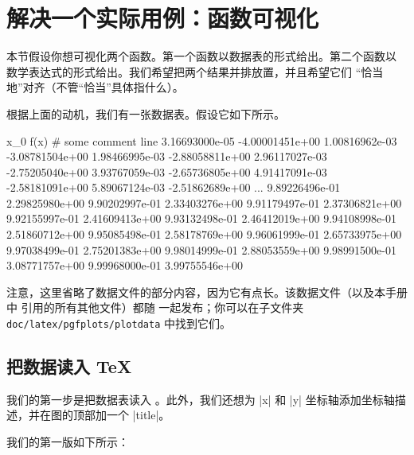 \section{解决一个实际用例：函数可视化}

本节假设你想可视化两个函数。第一个函数以数据表的形式给出。第二个函数以
数学表达式的形式给出。我们希望把两个结果并排放置，并且希望它们
“恰当地”对齐（不管“恰当”具体指什么）。

根据上面的动机，我们有一张数据表。假设它如下所示。
%
\begin{codeexample}
x_0	f(x)
# some comment line
3.16693000e-05	-4.00001451e+00
1.00816962e-03	-3.08781504e+00
1.98466995e-03	-2.88058811e+00
2.96117027e-03	-2.75205040e+00
3.93767059e-03	-2.65736805e+00
4.91417091e-03	-2.58181091e+00
5.89067124e-03	-2.51862689e+00
...
9.89226496e-01	2.29825980e+00
9.90202997e-01	2.33403276e+00
9.91179497e-01	2.37306821e+00
9.92155997e-01	2.41609413e+00
9.93132498e-01	2.46412019e+00
9.94108998e-01	2.51860712e+00
9.95085498e-01	2.58178769e+00
9.96061999e-01	2.65733975e+00
9.97038499e-01	2.75201383e+00
9.98014999e-01	2.88053559e+00
9.98991500e-01	3.08771757e+00
9.99968000e-01	3.99755546e+00
\end{codeexample}
%
注意，这里省略了数据文件的部分内容，因为它有点长。该数据文件（以及本手册中
引用的所有其他文件）都随 \PGFPlots{} 一起发布；你可以在子文件夹
\texttt{doc/latex/pgfplots/plotdata} 中找到它们。


\subsection{把数据读入 \TeX{}}
\label{sec:tut1:step1}

我们的第一步是把数据表读入 \PGFPlots{}。此外，我们还想为 |x| 和 |y|
坐标轴添加坐标轴描述，并在图的顶部加一个 |title|。

我们的第一版如下所示：
%
\begin{codeexample}[]

%

%
\end{codeexample}

